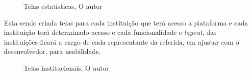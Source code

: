 \begin{figure}[H]
    \caption{Telas estatísticas, O autor}\label{fig:telas_plataforma}
\end{figure}

\par Esta sendo criada telas para cada instituição que terá acesso a plataforma e cada instituição terá determinado acesso e cada funcionalidade e \textit{layout}, das instituições ficará a cargo de cada representante da referida, em ajustar com o desenvolvedor, para usabilidade.

\begin{figure}[H]
    \center
    \caption{Telas institucionais, O autor}\label{fig:telas_plataforma}
\end{figure}



